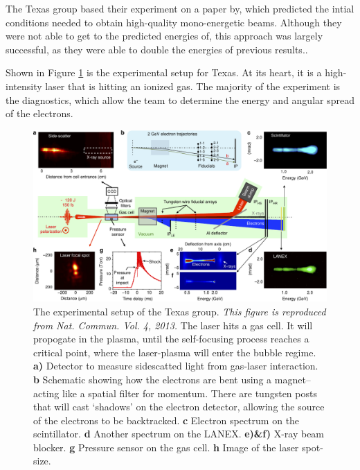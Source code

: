 \documentclass[12pt,letter]{article}
\begin{document}
The Texas group based their experiment on a paper by\cite{}, which
predicted the intial conditions needed to obtain high-quality mono-energetic
beams. Although they were not able to get to the predicted energies of\cite{},
this approach was largely successful, as they were able to double the energies
of previous results\cite{PhysRevLett.113.245001}.\cite{}.

Shown in Figure \ref{fig:experTexas} is the experimental setup for Texas. At
its heart, it is a high-intensity laser that is hitting an ionized gas. The
majority of the experiment is the diagnostics, which allow the team to determine
the energy and angular spread of the electrons.
\begin{figure}[b!]
	\includegraphics[width=\textwidth]{../figures/texasexplayout.pdf}
    \caption{\small The experimental setup of the Texas group.\cite{Wang2013}
        {\em This
        figure is reproduced from Nat. Commun. Vol. 4, 2013. } The laser hits
            a gas cell. It will propogate in the plasma, until the self-focusing
            process reaches a critical point, where the laser-plasma will enter
            the bubble regime. \textbf{a)} Detector to measure sidescatted light
            from gas-laser interaction. \textbf{b} Schematic showing how the
            electrons are bent using a magnet-- acting like a spatial filter for
            momentum. There are tungsten posts that will cast `shadows' on the
            electron detector, allowing the source of the electrons to be
            backtracked. \textbf{c} Electron spectrum on the scintillator.
            \textbf{d} Another spectrum on the LANEX. \textbf{e)\&f)} X-ray beam
            blocker. \textbf{g} Pressure sensor on the gas cell. \textbf{h}
            Image of the laser spot-size.
        \label{fig:experTexas} }
    
\end{figure}
\end{document}
